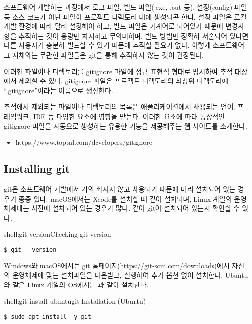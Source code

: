 소프트웨어 개발하는 과정에서 로그 파일, 빌드 파일(.exe, .out 등), 설정(config) 파일 등 소스 코드가 아닌 파일이 프로젝트 디렉토리 내에 생성되곤 한다. 설정 파일은 로컬 개발 환경에 따라 달리 설정해야 하고, 빌드 파일은 기계어로 되어있기 때문에 변경사항을 추적하는 것이 용량만 차지하고 무의미하며, 빌드 방법만 정확히 서술되어 있다면 다른 사용자가 충분히 빌드할 수 있기 때문에 추적할 필요가 없다. 이렇게 소프트웨어 그 자체와는 무관한 파일들은 git을 통해 추적하지 않는 것이 권장된다.

이러한 파일이나 디렉토리를 gitignore 파일에 정규 표현식 형태로 명시하여 추적 대상에서 제외할 수 있다. gitignore 파일은 프로젝트 디렉토리의 최상위 디렉토리에 ``.gitignore''이라는 이름으로 생성한다.

추적에서 제외되는 파일이나 디렉토리의 목록은 애플리케이션에서 사용되는 언어, 프레임워크, IDE 등 다양한 요소에 영향을 받는다. 이러한 요소에 따라 통상적인 gitignore 파일을 자동으로 생성하는 유용한 기능을 제공해주는 웹 사이트를 소개한다.

\begin{itemize}
    \item https://www.toptal.com/developers/gitignore
\end{itemize}

\subsection*{Installing git}

git은 소프트웨어 개발에서 거의 빠지지 않고 사용되기 때문에 미리 설치되어 있는 경우가 종종 있다. macOS에서는 Xcode를 설치할 때 같이 설치되며, Linux 계열의 운영체제에는 사전에 설치되어 있는 경우가 많다. \과 같이 git이 설치되어 있는지 확인할 수 있다.

\begin{shellenv}{shell:git-version}{Checking git version}\begin{verbatim}
$ git --version
\end{verbatim}
\end{shellenv}

Windows와 macOS에서는 git 홈페이지(https://git-scm.com/downloads)에서 자신의 운영체제에 맞는 설치파일을 다운받고, 실행하여 추가 옵션 없이 설치한다. Ubuntu와 같은 Linux 계열의 OS에서는 과 같이 설치한다.

\begin{shellenv}{shell:git-install-ubuntu}{git Installation (Ubuntu)}\begin{verbatim}
$ sudo apt install -y git
\end{verbatim}
\end{shellenv}

